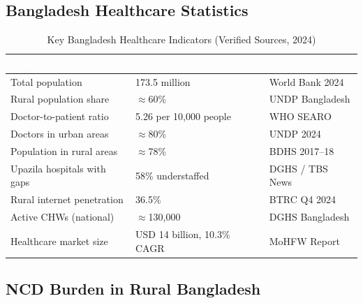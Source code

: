 \documentclass[12pt, a4paper]{article}
\begin{document}
\subsection{Bangladesh Healthcare Statistics}

\begin{table}[H]
\centering
\caption{Key Bangladesh Healthcare Indicators (Verified Sources, 2024)}
\small
\begin{tabularx}{\linewidth}{@{}lXl@{}}
\toprule
\rowcolor{navycolor}
\textcolor{white}{\textbf{Indicator}} &
\textcolor{white}{\textbf{Value}} &
\textcolor{white}{\textbf{Source}} \\
\midrule
Total population           & 173.5 million              & World Bank 2024 \\
\rowcolor{gray10}
Rural population share     & $\approx$60\%              & UNDP Bangladesh \\
Doctor-to-patient ratio    & 5.26 per 10,000 people     & WHO SEARO \\
\rowcolor{gray10}
Doctors in urban areas     & $\approx$80\%              & UNDP 2024 \\
Population in rural areas  & $\approx$78\%              & BDHS 2017--18 \\
\rowcolor{gray10}
Upazila hospitals with gaps & 58\% understaffed         & DGHS / TBS News \\
Rural internet penetration & 36.5\%                     & BTRC Q4 2024 \\
\rowcolor{gray10}
Active CHWs (national)     & $\approx$130,000           & DGHS Bangladesh \\
Healthcare market size     & USD 14 billion, 10.3\% CAGR & MoHFW Report \\
\bottomrule
\end{tabularx}
\end{table}

\subsection{NCD Burden in Rural Bangladesh}
\end{document}
